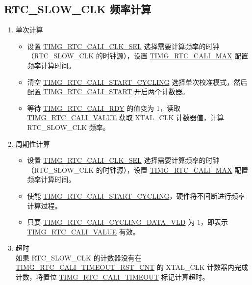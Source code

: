 \documentclass[main\_\_CN.tex]{subfiles}
\begin{document}
\subsection{RTC\_SLOW\_CLK 频率计算}
\begin{enumerate}
    \item 单次计算
    \begin{itemize}
        \item 设置 \hyperref[fielddesc:TIMGRTCCALICLKSEL]{TIMG\_RTC\_CALI\_CLK\_SEL} 选择需要计算频率的时钟（RTC\_SLOW\_CLK 的时钟源），设置 \hyperref[fielddesc:TIMGRTCCALIMAX]{TIMG\_RTC\_CALI\_MAX} 配置频率计算时间。
        \item 清空 \hyperref[fielddesc:TIMGRTCCALISTARTCYCLING]{TIMG\_RTC\_CALI\_START\_CYCLING} 选择单次校准模式，然后配置 \hyperref[fielddesc:TIMGRTCCALISTART]{TIMG\_RTC\_CALI\_START} 开启两个计数器。
        \item 等待 \hyperref[fielddesc:TIMGRTCCALIRDY]{TIMG\_RTC\_CALI\_RDY} 的值变为 1，读取 \hyperref[fielddesc:TIMGRTCCALIVALUE]{TIMG\_RTC\_CALI\_VALUE} 获取 XTAL\_CLK 计数器值，计算 RTC\_SLOW\_CLK 频率。
    \end{itemize}
    \item 周期性计算
    \begin{itemize}
        \item 设置 \hyperref[fielddesc:TIMGRTCCALICLKSEL]{TIMG\_RTC\_CALI\_CLK\_SEL} 选择需要计算频率的时钟（RTC\_SLOW\_CLK 的时钟源），设置 \hyperref[fielddesc:TIMGRTCCALIMAX]{TIMG\_RTC\_CALI\_MAX} 配置频率计算时间。
        \item 使能 \hyperref[fielddesc:TIMGRTCCALISTARTCYCLING]{TIMG\_RTC\_CALI\_START\_CYCLING}，硬件将不间断进行频率计算过程。
        \item 只要 \hyperref[fielddesc:TIMGRTCCALICYCLINGDATAVLD]{TIMG\_RTC\_CALI\_CYCLING\_DATA\_VLD} 为 1，即表示 \hyperref[fielddesc:TIMGRTCCALIVALUE]{TIMG\_RTC\_CALI\_VALUE} 有效。
    \end{itemize}
    \item 超时\\
    如果 RTC\_SLOW\_CLK 的计数器没有在 \hyperref[fielddesc:TIMGRTCCALITIMEOUTRSTCNT]{TIMG\_RTC\_CALI\_TIMEOUT\_RST\_CNT} 的 XTAL\_CLK 计数器内完成计数，将置位 \hyperref[fielddesc:TIMGRTCCALITIMEOUT]{TIMG\_RTC\_CALI\_TIMEOUT} 标记计算超时。
\end{enumerate}


\end{document}
